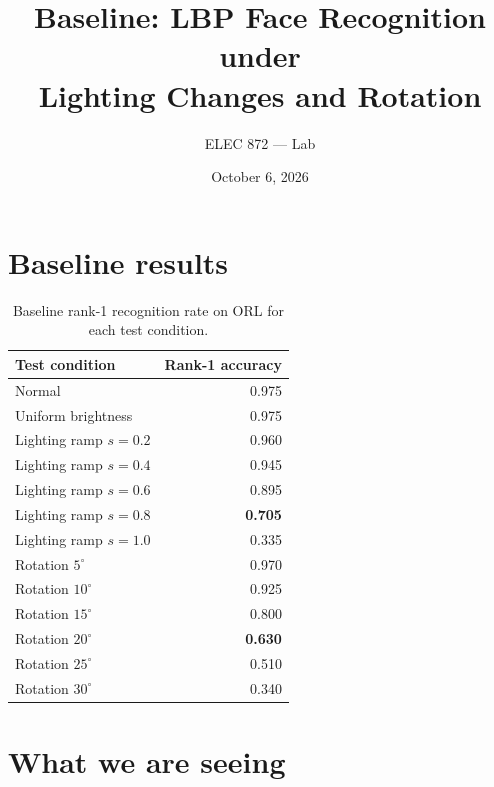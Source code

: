 \documentclass[11pt]{article}
\title{Baseline: LBP Face Recognition under\\ Lighting Changes and Rotation}
\author{ELEC 872 --- Lab}
\date{October 6, 2026}
\begin{document}
\maketitle

\section{Baseline results}

\begin{table}[htbp]
  \centering
  \caption{Baseline rank-1 recognition rate on ORL for each test condition.}
  \label{tab:baseline}
  \begin{tabular}{lr}
    \toprule
    Test condition & Rank-1 accuracy \\
    \midrule
    Normal                          & 0.975 \\
    \midrule
    Uniform brightness              & 0.975 \\
    \midrule
    Lighting ramp $s = 0.2$         & 0.960 \\
    Lighting ramp $s = 0.4$         & 0.945 \\
    Lighting ramp $s = 0.6$         & 0.895 \\
    Lighting ramp $s = 0.8$         & \textbf{0.705} \\
    Lighting ramp $s = 1.0$         & 0.335 \\
    \midrule
    Rotation $5^\circ$              & 0.970 \\
    Rotation $10^\circ$             & 0.925 \\
    Rotation $15^\circ$             & 0.800 \\
    Rotation $20^\circ$             & \textbf{0.630} \\
    Rotation $25^\circ$             & 0.510 \\
    Rotation $30^\circ$             & 0.340 \\
    \bottomrule
  \end{tabular}
\end{table}

\section{What we are seeing}
\end{document}
